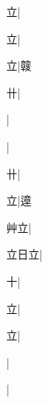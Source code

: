 \begin{multicols}{2}
{{\cjk{}{\cnsym{}　}{\cnsym{}　}立}|{}\par
{\cjk{}{\cnsym{}　}{\cnsym{}　}立}|{}\par
{\cjk{}{\cnsym{}　}{\cnsym{}　}立}|{\cjk{}竷}\par
{\cjk{}{\cnsym{}　}{\cnsym{}　}卄}|{}\par
{}|{}\par
{\cjk{}{\cnsym{}　}{\cnsym{}　}{\cnsym{}　}}|{}\par
{\cjk{}{\cnsym{}　}{\cnsym{}　}卄}|{}\par
{\cjk{}{\cnsym{}　}{\cnsym{}　}立}|{\cjk{}遧}\par
{\cjk{}{\cnsym{}　}艸立}|{}\par
{\cjk{}立日立}|{}\par
{\cjk{}{\cnsym{}　}{\cnsym{}　}十}|{}\par
{\cjk{}{\cnsym{}　}{\cnsym{}　}立}|{}\par
{\cjk{}{\cnsym{}　}{\cnsym{}　}立}|{}\par
{\cjk{}{\cnsym{}　}{\cnsym{}　}{\cnsym{}　}}|{}\par
{}|{}\par
}
\end{multicols}

